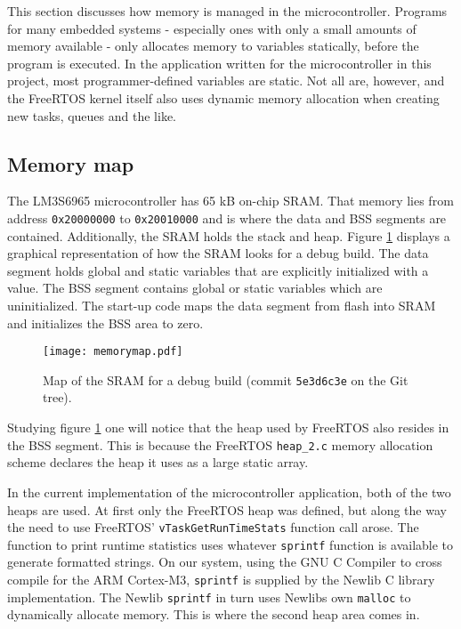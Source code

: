 This section discusses how memory is managed in the microcontroller. Programs for many embedded systems - especially ones with only a small amounts of memory available - only allocates memory to variables statically, before the program is executed. In the application written for the microcontroller in this project, most programmer-defined variables are static. Not all are, however, and the FreeRTOS kernel itself also uses dynamic memory allocation when creating new tasks, queues and the like. 


\subsection{Memory map}
The LM3S6965 microcontroller has 65 kB on-chip SRAM. That memory lies from address \texttt{0x20000000} to \texttt{0x20010000} \cite[71]{lm3s6965} and is where the data and BSS segments are contained. Additionally, the SRAM holds the stack and heap. Figure \ref{fig:memmap} displays a graphical representation of how the SRAM looks for a debug build. The data segment holds global and static variables that are explicitly initialized with a value. The BSS segment contains global or static variables which are uninitialized. The start-up code maps the data segment from flash into SRAM and initializes the BSS area to zero.

\begin{figure}[htb]
	\centering
	\texttt{[image: memorymap.pdf]}%
	\caption{Map of the SRAM for a debug build (commit \texttt{5e3d6c3e} on the Git tree).}
	\label{fig:memmap}
\end{figure}

Studying figure \ref{fig:memmap} one will notice that the heap used by FreeRTOS also resides in the BSS segment. This is because the FreeRTOS \texttt{heap\_2.c} memory allocation scheme declares the heap it uses as a large static array.

In the current implementation of the microcontroller application, both of the two heaps are used. At first only the FreeRTOS heap was defined, but along the way the need to use FreeRTOS' \texttt{vTaskGetRunTimeStats} function call arose. The function to print runtime statistics uses whatever \texttt{sprintf} function is available to generate formatted strings. On our system, using the GNU C Compiler to cross compile for the ARM Cortex-M3, \texttt{sprintf} is supplied by the Newlib C library implementation. The Newlib \texttt{sprintf} in turn uses Newlibs own \texttt{malloc} to dynamically allocate memory. This is where the second heap area comes in.

